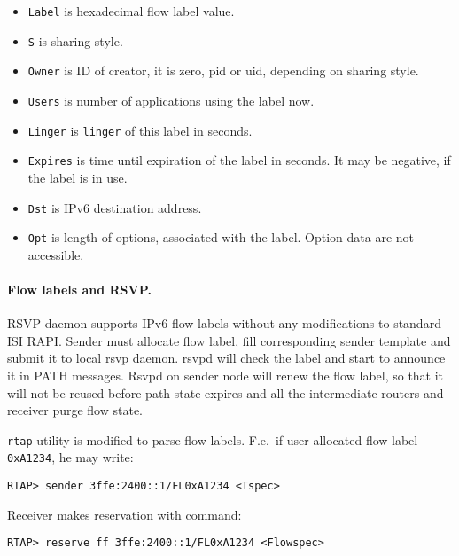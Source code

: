\begin{itemize}
\item \verb|Label| is hexadecimal flow label value.
\item \verb|S| is sharing style.
\item \verb|Owner| is ID of creator, it is zero, pid or uid, depending on
		sharing style.
\item \verb|Users| is number of applications using the label now.
\item \verb|Linger| is \verb|linger| of this label in seconds.
\item \verb|Expires| is time until expiration of the label in seconds. It may
	be negative, if the label is in use.
\item \verb|Dst| is IPv6 destination address.
\item \verb|Opt| is length of options, associated with the label. Option
	data are not accessible.
\end{itemize}


\paragraph{Flow labels and RSVP.} 
RSVP daemon supports IPv6 flow labels
without any modifications to standard ISI RAPI. Sender must allocate
flow label, fill corresponding sender template and submit it to local rsvp
daemon. rsvpd will check the label and start to announce it in PATH
messages. Rsvpd on sender node will renew the flow label, so that it will not
be reused before path state expires and all the intermediate
routers and receiver purge flow state.

\verb|rtap| utility is modified to parse flow labels. F.e.\ if user allocated
flow label \verb|0xA1234|, he may write:

\begin{verbatim}
RTAP> sender 3ffe:2400::1/FL0xA1234 <Tspec>
\end{verbatim}

Receiver makes reservation with command:
\begin{verbatim}
RTAP> reserve ff 3ffe:2400::1/FL0xA1234 <Flowspec>
\end{verbatim}


